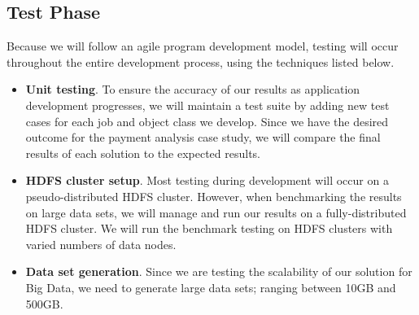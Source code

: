 \documentclass[letterpaper,12pt,titlepage]{article}
\begin{document}
\subsection{Test Phase}
Because we will follow an agile program development model, testing will occur
throughout the entire development process, using the techniques listed below.
\begin{itemize}
  \item \textbf{Unit testing}. To ensure the accuracy of our results as
        application development progresses, we will maintain a test suite by
        adding new test cases for each job and object class we develop. Since we
        have the desired outcome for the payment analysis case study, we will
        compare the final results of each solution to the expected results.
  \item \textbf{HDFS cluster setup}. Most testing during development will occur
        on a pseudo-distributed HDFS cluster. However, when benchmarking the
        results on large data sets, we will manage and run our results on a
        fully-distributed HDFS cluster. We will run the benchmark testing on
        HDFS clusters with varied numbers of data nodes.  

  \item \textbf{Data set generation}. Since we are testing the scalability of
        our solution for Big Data, we need to generate large data sets; ranging
        between 10GB and 500GB. 
\end{itemize}

\end{document}
